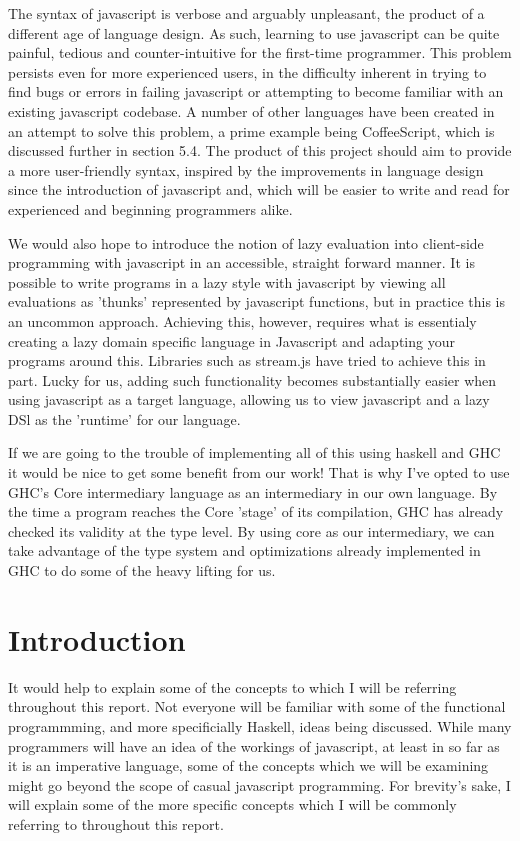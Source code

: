 \documentclass[11pt]{article}
\begin{document}
The syntax of javascript is verbose and arguably unpleasant, the product of a different
age of language design. As such, learning to use javascript can be quite painful, tedious
and counter-intuitive for the first-time programmer. This problem persists even for
more experienced users, in the difficulty inherent in trying to find bugs or errors in
failing javascript or attempting to become familiar with an existing javascript codebase.
A number of other languages have been created in an attempt to solve this problem, a prime
example being CoffeeScript, which is discussed further in section 5.4. The product of this
project should aim to provide a more user-friendly syntax, inspired by the improvements
in language design since the introduction of javascript and, which will be easier
to write and read for experienced and beginning programmers alike. 

We would also hope to introduce the notion of lazy evaluation into client-side programming
with javascript in an accessible, straight forward manner. It is possible to write programs
in a lazy style with javascript by viewing all evaluations as 'thunks' represented by 
javascript functions, but in practice this is an uncommon approach. Achieving this, however,
requires what is essentialy creating a lazy domain specific language in Javascript and 
adapting your programs around this. Libraries such as stream.js have tried to achieve this
in part. Lucky for us, adding such functionality becomes substantially easier when using
javascript as a target language, allowing us to view javascript and a lazy DSl as the 
'runtime' for our language. 

If we are going to the trouble of implementing all of this using haskell and GHC it would
be nice to get some benefit from our work! That is why I've opted to use GHC's Core 
intermediary language as an intermediary in our own language. By the time a program reaches
the Core 'stage' of its compilation, GHC has already checked its validity at the type level.
By using core as our intermediary, we can take advantage of the type system and optimizations
already implemented in GHC to do some of the heavy lifting for us. 

\pagebreak

\section{Introduction}
It would help to explain some of the concepts to which I will be referring 
throughout this report. Not everyone will be familiar with some of the 
functional programmming, and more specificially Haskell, ideas being discussed.
While many programmers will have an idea of the workings of javascript, at
least in so far as it is an imperative language, some of the concepts which 
we will be examining might go beyond the scope of casual javascript programming.
For brevity's sake, I will explain some of the more specific concepts which 
I will be commonly referring to throughout this report.
\end{document}
